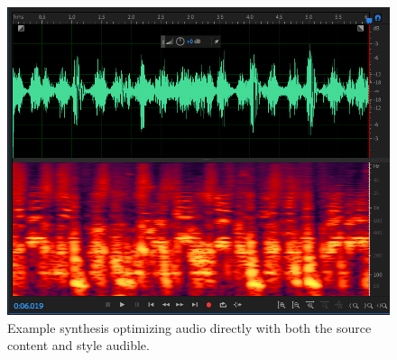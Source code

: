 \documentclass{article}
\begin{document}
\begin{figure}
\centering
\includegraphics[width=1\linewidth]{synthesis}
\caption{Example synthesis optimizing audio directly with both the source content and style audible.}
\end{figure}
\end{document}
